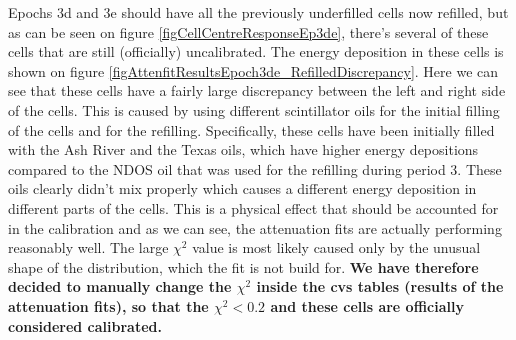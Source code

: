 \documentclass[12pt,a4paper]{article}
\begin{document}
Epochs 3d and 3e should have all the previously underfilled cells now refilled, but as can be seen on figure \ref{figCellCentreResponseEp3de}, there's several of these cells that are still (officially) uncalibrated. The energy deposition in these cells is shown on figure \ref{figAttenfitResultsEpoch3de_RefilledDiscrepancy}. Here we can see that these cells have a fairly large discrepancy between the left and right side of the cells. This is caused by using different scintillator oils for the initial filling of the cells and for the refilling. Specifically, these cells have been initially filled with the Ash River and the Texas oils, which have higher energy depositions compared to the NDOS oil that was used for the refilling during period 3. These oils clearly didn't mix properly which causes a different energy deposition in different parts of the cells. This is a physical effect that should be accounted for in the calibration and as we can see, the attenuation fits are actually performing reasonably well. The large $\chi^2$ value is most likely caused only by the unusual shape of the distribution, which the fit is not build for. \textbf{We have therefore decided to manually change the $\chi^2$ inside the cvs tables (results of the attenuation fits), so that the $\chi^2<0.2$ and these cells are officially considered calibrated.}
\end{document}
